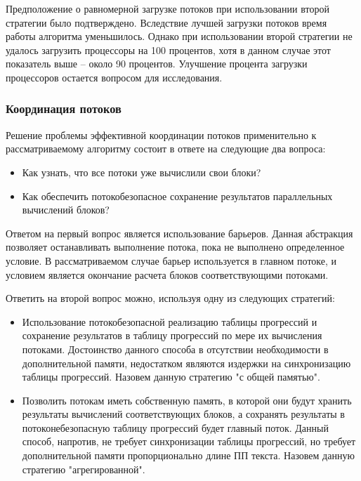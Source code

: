 \documentclass[14pt]{article}
\begin{document}
Предположение о равномерной загрузке потоков при использовании второй стратегии было подтверждено. Вследствие лучшей загрузки потоков время работы алгоритма уменьшилось. Однако при использовании второй стратегии не удалось загрузить процессоры на 100 процентов, хотя в данном случае этот показатель выше -- около 90 процентов. Улучшение процента загрузки процессоров остается вопросом для исследования. 


\subsubsection{Координация потоков}

Решение проблемы эффективной координации потоков применительно к рассматриваемому алгоритму состоит в ответе на следующие два вопроса:
\begin{itemize}

\item Как узнать, что все потоки уже вычислили свои блоки?
\item Как обеспечить потокобезопасное сохранение результатов параллельных вычислений блоков? 

\end{itemize}


Ответом на первый вопрос является использование барьеров. Данная абстракция позволяет останавливать выполнение потока, пока не выполнено определенное условие. В рассматриваемом случае барьер используется в главном потоке, и условием является окончание расчета блоков соответствующими потоками.

Ответить на второй вопрос можно, используя одну из следующих стратегий:
\begin{itemize}
\item Использование потокобезопасной реализацию таблицы прогрессий и сохранение результатов в таблицу прогрессий по мере их вычисления потоками. Достоинство данного способа в отсутствии необходимости в дополнительной памяти, недостатком являются издержки на синхронизацию таблицы прогрессий. Назовем данную стратегию "с общей памятью".
\item Позволить потокам иметь собственную память, в которой они будут хранить результаты вычислений соответствующих блоков, а сохранять результаты в потоконебезопасную таблицу прогрессий будет главный поток. Данный способ, напротив, не требует синхронизации таблицы прогрессий, но требует дополнительной памяти пропорционально длине ПП текста. Назовем данную стратегию "агрегированной".
\end{itemize}
\end{document}
